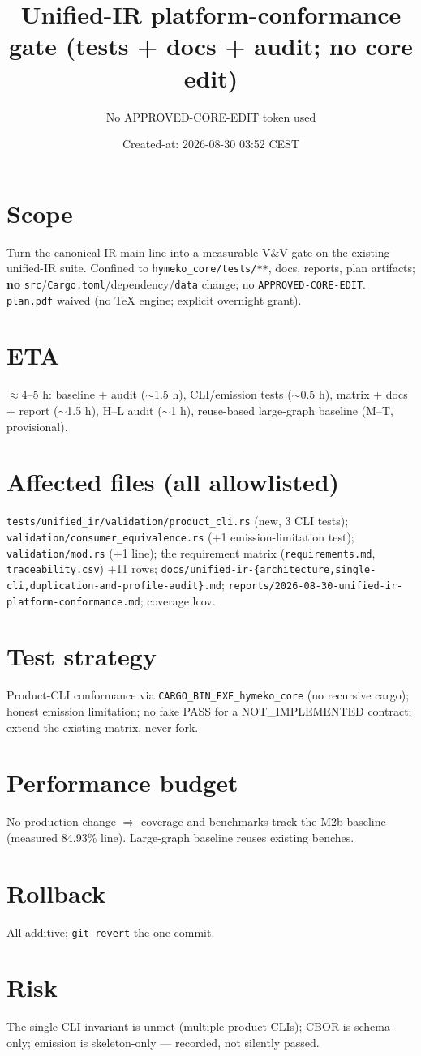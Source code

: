 \documentclass[11pt]{article}
\title{Unified-IR platform-conformance gate (tests + docs + audit; no core edit)}
\author{No APPROVED-CORE-EDIT token used}
\date{Created-at: 2026-08-30 03:52 CEST}
\begin{document}
\maketitle
\section*{Scope}
Turn the canonical-IR main line into a measurable V\&V gate on the existing
unified-IR suite. Confined to \texttt{hymeko\_core/tests/**}, docs, reports, plan
artifacts; \textbf{no} \texttt{src}/\texttt{Cargo.toml}/dependency/\texttt{data}
change; no \texttt{APPROVED-CORE-EDIT}. \texttt{plan.pdf} waived (no TeX engine;
explicit overnight grant).
\section{ETA} $\approx$4--5 h: baseline + audit ($\sim$1.5 h), CLI/emission tests
($\sim$0.5 h), matrix + docs + report ($\sim$1.5 h), H--L audit ($\sim$1 h),
reuse-based large-graph baseline (M--T, provisional).
\section{Affected files (all allowlisted)}
\texttt{tests/unified\_ir/validation/product\_cli.rs} (new, 3 CLI tests);
\texttt{validation/consumer\_equivalence.rs} (+1 emission-limitation test);
\texttt{validation/mod.rs} (+1 line); the requirement matrix
(\texttt{requirements.md}, \texttt{traceability.csv}) +11 rows;
\texttt{docs/unified-ir-\{architecture,single-cli,duplication-and-profile-audit\}.md};
\texttt{reports/2026-08-30-unified-ir-platform-conformance.md}; coverage lcov.
\section{Test strategy} Product-CLI conformance via
\texttt{CARGO\_BIN\_EXE\_hymeko\_core} (no recursive cargo); honest emission
limitation; no fake PASS for a NOT\_IMPLEMENTED contract; extend the existing
matrix, never fork.
\section{Performance budget} No production change $\Rightarrow$ coverage and
benchmarks track the M2b baseline (measured 84.93\% line). Large-graph baseline
reuses existing benches.
\section{Rollback} All additive; \texttt{git revert} the one commit.
\section{Risk} The single-CLI invariant is unmet (multiple product CLIs); CBOR is
schema-only; emission is skeleton-only --- recorded, not silently passed.
\end{document}
